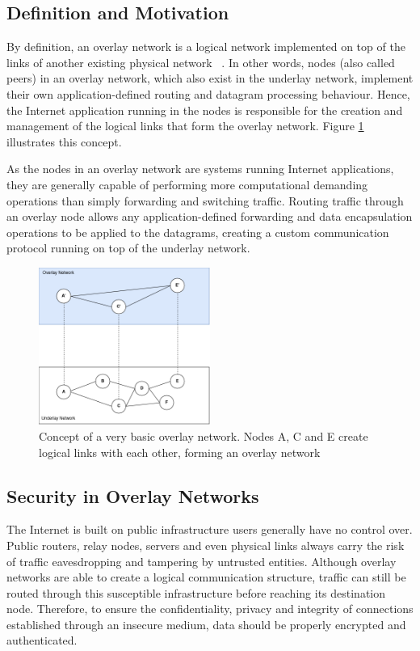 \documentclass[11pt,twoside,a4paper]{report}
\begin{document}
\subsection{Definition and Motivation}

By definition, an overlay network is a logical network implemented on top of the links of another existing physical network ~\cite{livronet}. In other words, nodes (also called peers) in an overlay network, which also exist in the underlay network, implement their own application-defined routing and datagram processing behaviour. Hence, the Internet application running in the nodes is responsible for the creation and management of the logical links that form the overlay network. Figure \ref{fig:overlay} illustrates this concept.

As the nodes in an overlay network are systems running Internet applications, they are generally capable of performing more computational demanding operations than simply forwarding and switching traffic. Routing traffic through an overlay node allows any application-defined forwarding and data encapsulation operations to be applied to the datagrams, creating a custom communication protocol running on top of the underlay network.

\begin{figure}[h]
\centering
\includegraphics[width=0.5\textwidth]{overlays.png}
\caption{Concept of a very basic overlay network. Nodes A, C and E create logical links with each other, forming an overlay network}
\label{fig:overlay}
\end{figure}

\subsection{Security in Overlay Networks}

The Internet is built on public infrastructure users generally have no control over. Public routers, relay nodes, servers and even physical links always carry the risk of traffic eavesdropping and tampering by untrusted entities. Although overlay networks are able to create a logical communication structure, traffic can still be routed through this susceptible infrastructure before reaching its destination node. Therefore, to ensure the confidentiality, privacy and integrity of connections established through an insecure medium, data should be properly encrypted and authenticated.
\end{document}
